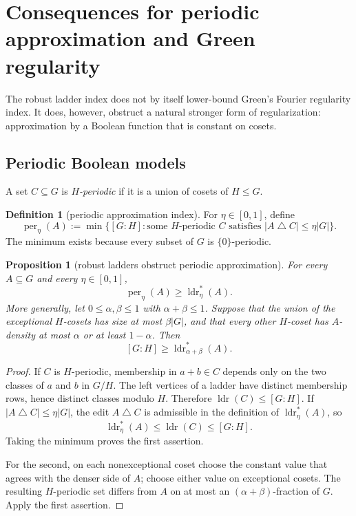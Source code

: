 \documentclass[11pt]{article}
\theoremstyle{plain}
\newtheorem{proposition}[theorem]{Proposition}
\theoremstyle{definition}
\newtheorem{definition}[theorem]{Definition}
\numberwithin{theorem}{section}
\newcommand{\abs}[1]{\lvert #1\rvert}
\newcommand{\ldr}{\operatorname{ldr}}
\newcommand{\ldrs}{\operatorname{ldr}^{*}}
\newcommand{\peridx}{\operatorname{per}}
\begin{document}
\section{Consequences for periodic approximation and Green regularity}\label{sec:consequences}

The robust ladder index does not by itself lower-bound Green's Fourier
regularity index.  It does, however, obstruct a natural stronger form of
regularization: approximation by a Boolean function that is constant on
cosets.

\subsection{Periodic Boolean models}

A set $C\subseteq G$ is \emph{$H$-periodic} if it is a union of cosets of
$H\le G$.
\begin{definition}[periodic approximation index]
For $\eta\in[0,1]$, define
\[
  \peridx_\eta(A):=
  \min\bigl\{[G:H]:\text{some $H$-periodic $C$ satisfies }
  \abs{A\mathbin\triangle C}\le\eta\abs G\bigr\}.
\]
The minimum exists because every subset of $G$ is $\{0\}$-periodic.
\end{definition}

\begin{proposition}[robust ladders obstruct periodic approximation]
\label{prop:periodic}
For every $A\subseteq G$ and every $\eta\in[0,1]$,
\[
  \peridx_\eta(A)\ge\ldrs_\eta(A).
\]
More generally, let $0\le\alpha,\beta\le1$ with $\alpha+\beta\le1$.
Suppose that the union of the exceptional $H$-cosets has size at most
$\beta\abs G$, and that every other $H$-coset has $A$-density at most
$\alpha$ or at least $1-\alpha$.  Then
\[
  [G:H]\ge\ldrs_{\alpha+\beta}(A).
\]
\end{proposition}

\begin{proof}
If $C$ is $H$-periodic, membership in $a+b\in C$ depends only on the two
classes of $a$ and $b$ in $G/H$.  The left vertices of a ladder have distinct
membership rows, hence distinct classes modulo $H$.  Therefore
$\ldr(C)\le[G:H]$.  If $\abs{A\mathbin\triangle C}\le\eta\abs G$, the edit
$A\mathbin\triangle C$ is admissible in the definition of
$\ldrs_\eta(A)$, so
\[
  \ldrs_\eta(A)\le\ldr(C)\le[G:H].
\]
Taking the minimum proves the first assertion.

For the second, on each nonexceptional coset choose the constant value that
agrees with the denser side of $A$; choose either value on exceptional
cosets.  The resulting $H$-periodic set differs from $A$ on at most an
$(\alpha+\beta)$-fraction of $G$.  Apply the first assertion.
\end{proof}
\end{document}
